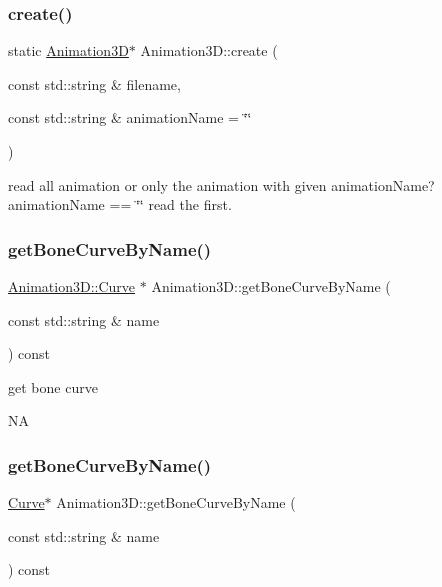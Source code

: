 \subsubsection{\texorpdfstring{create()}{create()}\hspace{0.1cm}{\footnotesize\ttfamily [2/2]}}
{\footnotesize\ttfamily static \hyperlink{classAnimation3D}{Animation3D}$\ast$ Animation3\+D\+::create (\begin{DoxyParamCaption}\item[{const std\+::string \&}]{filename,  }\item[{const std\+::string \&}]{animation\+Name = {\ttfamily \char`\"{}\char`\"{}} }\end{DoxyParamCaption})\hspace{0.3cm}{\ttfamily [static]}}

read all animation or only the animation with given animation\+Name? animation\+Name == \char`\"{}\char`\"{} read the first. \mbox{\label{classAnimation3D_a8fa5d064055406d8bccb521254ba505b}} 
\subsubsection{\texorpdfstring{get\+Bone\+Curve\+By\+Name()}{getBoneCurveByName()}\hspace{0.1cm}{\footnotesize\ttfamily [1/2]}}
{\footnotesize\ttfamily \hyperlink{classAnimation3D_1_1Curve}{Animation3\+D\+::\+Curve} $\ast$ Animation3\+D\+::get\+Bone\+Curve\+By\+Name (\begin{DoxyParamCaption}\item[{const std\+::string \&}]{name }\end{DoxyParamCaption}) const}

get bone curve

NA \mbox{\label{classAnimation3D_a40f75128bcce9eb840460c3a7e343e4f}} 
\subsubsection{\texorpdfstring{get\+Bone\+Curve\+By\+Name()}{getBoneCurveByName()}\hspace{0.1cm}{\footnotesize\ttfamily [2/2]}}
{\footnotesize\ttfamily \hyperlink{classAnimation3D_1_1Curve}{Curve}$\ast$ Animation3\+D\+::get\+Bone\+Curve\+By\+Name (\begin{DoxyParamCaption}\item[{const std\+::string \&}]{name }\end{DoxyParamCaption}) const}

